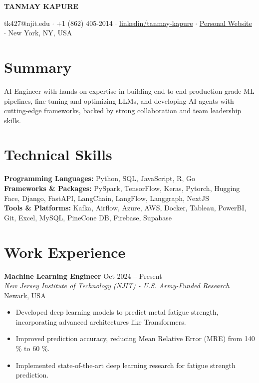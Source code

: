 \documentclass[10pt, a4paper]{article}
\begin{document}
\begin{center}
    \textbf{\huge TANMAY KAPURE}
    \vspace{3pt}
    
    tk427@njit.edu $\cdot$ +1 (862) 405-2014 $\cdot$ \href{https://www.linkedin.com/in/tanmay-kapure/}{linkedin/tanmay-kapure} $\cdot$ \href{https://tanmaysk001.github.io/tanmaykapure.github.io/}{Personal Website} $\cdot$ New York, NY, USA
\end{center}


\section*{Summary}
AI Engineer with hands-on expertise in building end-to-end production grade ML pipelines, fine-tuning and optimizing LLMs, and developing AI agents with cutting-edge frameworks, backed by strong collaboration and team leadership skills.

\vspace{2pt}
\section*{Technical Skills}
\noindent\textbf{Programming Languages:} Python, SQL, JavaScript, R, Go  \\
\textbf{Frameworks \& Packages:} PySpark, TensorFlow, Keras, Pytorch, Hugging Face, Django, FastAPI, LangChain, LangFlow, Langgraph, NextJS  \\
\textbf{Tools \& Platforms:} Kafka, Airflow, Azure, AWS, Docker, Tableau, PowerBI, Git, Excel, MySQL, PineCone DB, Firebase, Supabase

\vspace{2pt}
\section*{Work Experience}
\vspace{2pt}

\textbf{Machine Learning Engineer} \hfill Oct 2024 – Present \\
\textit{New Jersey Institute of Technology (NJIT) - U.S. Army-Funded Research} \hfill Newark, USA
\begin{itemize}
    \item Developed deep learning models to predict metal fatigue strength, incorporating advanced architectures like Transformers.
    \item Improved prediction accuracy, reducing Mean Relative Error (MRE) from 140 \% to 60 \%. 
    \item Implemented state-of-the-art deep learning research for fatigue strength prediction. 
\end{itemize}
\vspace{2pt} %
\end{document}
